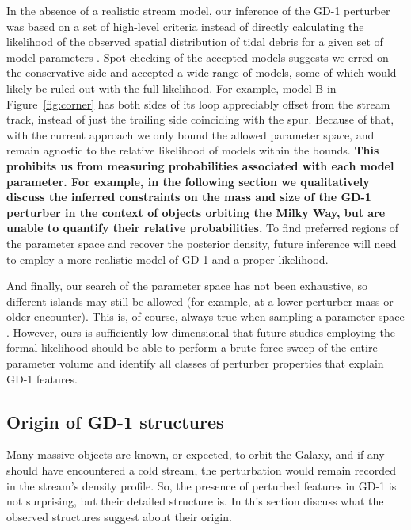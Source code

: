 \documentclass[twocolumn]{aastex62}
\newcommand{\changes}[1]{{\textbf{#1}}}
\begin{document}
In the absence of a realistic stream model, our inference of the GD-1 perturber was based on a set of high-level criteria instead of directly calculating the likelihood of the observed spatial distribution of tidal debris for a given set of model parameters \citep[e.g., likelihood developed in][]{bonaca2014}.
Spot-checking of the accepted models suggests we erred on the conservative side and accepted a wide range of models, some of which would likely be ruled out with the full likelihood.
For example, model B in Figure~\ref{fig:corner} has both sides of its loop appreciably offset from the stream track, instead of just the trailing side coinciding with the spur.
Because of that, with the current approach we only bound the allowed parameter space, and remain agnostic to the relative likelihood of models within the bounds.
\changes{This prohibits us from measuring probabilities associated with each model parameter.
For example, in the following section we qualitatively discuss the inferred constraints on the mass and size of the GD-1 perturber in the context of objects orbiting the Milky Way, but are unable to quantify their relative probabilities.}
To find preferred regions of the parameter space and recover the posterior density, future inference will need to employ a more realistic model of GD-1 and a proper likelihood.

And finally, our search of the parameter space has not been exhaustive, so different islands may still be allowed (for example, at a lower perturber mass or older encounter).
This is, of course, always true when sampling a parameter space \citep[e.g.,][]{hoggdfm2018}.
However, ours is sufficiently low-dimensional that future studies employing the formal likelihood should be able to perform a brute-force sweep of the entire parameter volume and identify all classes of perturber properties that explain GD-1 features.

\subsection{Origin of GD-1 structures}
\label{sec:origin}
Many massive objects are known, or expected, to orbit the Galaxy, and if any should have encountered a cold stream, the perturbation would remain recorded in the stream's density profile.
So, the presence of perturbed features in GD-1 is not surprising, but their detailed structure is.
In this section discuss what the observed structures suggest about their origin.
\end{document}

